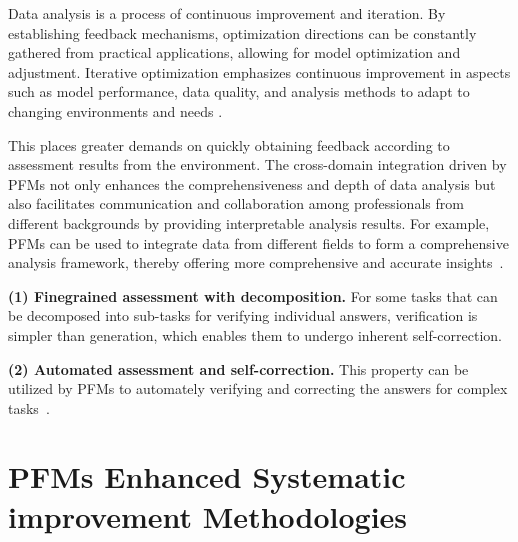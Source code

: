   
  Data analysis is a process of continuous improvement and iteration. By establishing feedback mechanisms, optimization directions can be constantly gathered from practical applications, allowing for model optimization and adjustment. Iterative optimization emphasizes continuous improvement in aspects such as model performance, data quality, and analysis methods to adapt to changing environments and needs \cite{033kaelbling1996reinforcement}.
  
  
  
  This places greater demands on quickly obtaining feedback according to assessment results from the environment. The cross-domain integration driven by PFMs not only enhances the comprehensiveness and depth of data analysis but also facilitates communication and collaboration among professionals from different backgrounds by providing interpretable analysis results. For example, PFMs can be used to integrate data from different fields to form a comprehensive analysis framework, thereby offering more comprehensive and accurate insights~\cite{yang2024give, hu2023survey}.

  
\begin{takeawaybox}
\textbf{(1) Finegrained assessment with decomposition. } For some tasks that can be decomposed into sub-tasks for verifying individual answers, verification is simpler than generation, which enables them to undergo inherent self-correction. 

\textbf{(2) Automated assessment and self-correction. } This property can be utilized by PFMs to automately verifying and correcting the answers for complex tasks~\cite{DhuliawalaKXRLC24}. 
\end{takeawaybox}

  

  


  
  
  \section{PFMs Enhanced Systematic improvement Methodologies}~\label{sec:methods}
  
  
